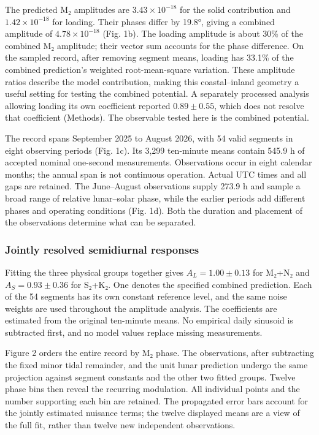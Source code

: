 \documentclass[
  10pt,
  a4paper,
]{article}
\begin{document}
The predicted M₂ amplitudes are \(3.43\times10^{-18}\) for the solid
contribution and \(1.42\times10^{-18}\) for loading. Their phases differ
by 19.8°, giving a combined amplitude of \(4.78\times10^{-18}\) (Fig.
1b). The loading amplitude is about 30\% of the combined M₂ amplitude;
their vector sum accounts for the phase difference. On the sampled
record, after removing segment means, loading has 33.1\% of the combined
prediction's weighted root-mean-square variation. These amplitude ratios
describe the model contribution, making this coastal--inland geometry a
useful setting for testing the combined potential. A separately
processed analysis allowing loading its own coefficient reported
\(0.89\pm0.55\), which does not resolve that coefficient (Methods). The
observable tested here is the combined potential.

The record spans September 2025 to August 2026, with 54 valid segments
in eight observing periods (Fig. 1c). Its 3,299 ten-minute means contain
545.9 h of accepted nominal one-second measurements. Observations occur
in eight calendar months; the annual span is not continuous operation.
Actual UTC times and all gaps are retained. The June--August
observations supply 273.9 h and sample a broad range of relative
lunar--solar phase, while the earlier periods add different phases and
operating conditions (Fig. 1d). Both the duration and placement of the
observations determine what can be separated.

\hypertarget{jointly-resolved-semidiurnal-responses}{%
\subsubsection{Jointly resolved semidiurnal
responses}\label{jointly-resolved-semidiurnal-responses}}

Fitting the three physical groups together gives \(A_L=1.00\pm0.13\) for
M₂+N₂ and \(A_S=0.93\pm0.36\) for S₂+K₂. One denotes the specified
combined prediction. Each of the 54 segments has its own constant
reference level, and the same noise weights are used throughout the
amplitude analysis. The coefficients are estimated from the original
ten-minute means. No empirical daily sinusoid is subtracted first, and
no model values replace missing measurements.

Figure 2 orders the entire record by M₂ phase. The observations, after
subtracting the fixed minor tidal remainder, and the unit lunar
prediction undergo the same projection against segment constants and the
other two fitted groups. Twelve phase bins then reveal the recurring
modulation. All individual points and the number supporting each bin are
retained. The propagated error bars account for the jointly estimated
nuisance terms; the twelve displayed means are a view of the full fit,
rather than twelve new independent observations.
\end{document}
